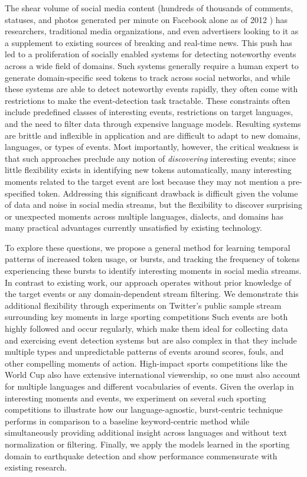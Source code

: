 \documentclass{sig-alternate}
\begin{document}
The shear volume of social media content (hundreds of thousands of comments, statuses, and photos generated per minute on Facebook alone as of 2012 \cite{Pring2012}) has researchers, traditional media organizations, and even advertisers looking to it as a supplement to existing sources of breaking and real-time news.
This push has led to a proliferation of socially enabled systems for detecting noteworthy events across a wide field of domains.
Such systems generally require a human expert to generate domain-specific seed tokens to track across social networks, and while these systems are able to detect noteworthy events rapidly, they often come with restrictions to make the event-detection task tractable. 
These constraints often include predefined classes of interesting events, restrictions on target languages, and the need to filter data through expensive language models.
Resulting systems are brittle and inflexible in application and are difficult to adapt to new domains, languages, or types of events.
Most importantly, however, the critical weakness is that such approaches preclude any notion of \emph{discovering} interesting events; since little flexibility exists in identifying new tokens automatically, many interesting moments related to the target event are lost because they may not mention a pre-specified token.
Addressing this significant drawback is difficult given the volume of data and noise in social media streams, but the flexibility to discover surprising or unexpected moments across multiple languages, dialects, and domains has many practical advantages currently unsatisfied by existing technology.

To explore these questions, we propose a general method for learning temporal patterns of increased token usage, or bursts, and tracking the frequency of tokens experiencing these bursts to identify interesting moments in social media streams.
In contrast to existing work, our approach operates without prior knowledge of the target events or any domain-dependent stream filtering.
We demonstrate this additional flexibility through experiments on Twitter's public sample stream surrounding key moments in large sporting competitions
Such events are both highly followed and occur regularly, which make them ideal for collecting data and exercising event detection systems but are also complex in that they include multiple types and unpredictable patterns of events around scores, fouls, and other compelling moments of action.
High-impact sports competitions like the World Cup also have extensive international viewership, so one must also account for multiple languages and different vocabularies of events.
Given the overlap in interesting moments and events, we experiment on several such sporting competitions to illustrate how our language-agnostic, burst-centric technique performs in comparison to a baseline keyword-centric method while simultaneously providing additional insight across languages and without text normalization or filtering.
Finally, we apply the models learned in the sporting domain to earthquake detection and show performance commensurate with existing research.
\end{document}
